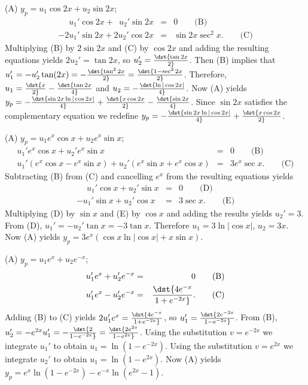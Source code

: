 \documentclass[dvips]{book}
\renewcommand{\exer}[1]{\par\medskip\;\noindent{\color{red}\bf #1.}}
\numberwithin{example}{section}
\numberwithin{equation}{section}
\numberwithin{theorem}{section}
\numberwithin{table}{section}
\numberwithin{figure}{section}
\begin{document}
\exer{5.7.2}
(A) $y_p=u_1\cos2x+u_2\sin2x$;
\setcounter{equation}{1}
\begin{eqnarray*}
\phantom{-2}u_1'\cos
2x+\phantom{2}u_2'\sin2x&=&0\qquad\text{(B)}\\ %
-2u_1'\sin2x+2u_2'\cos 2x&=&\sin2x\sec^2x.\qquad \text{(C)} %
\end{eqnarray*}
Multiplying (B) by $2\sin2x$ and (C)
by $\cos2x$ and adding the resulting equations yields $2u_2'=\tan2x$,
so $u_2'=\dst{\tan2x\over2}$. Then (B) implies that
$u_1'=-u_2'\tan(2x)=-\dst{\tan^22x\over2}=\dst{1-\sec^22x\over2}$.
Therefore,$u_1=\dst{x\over2}-\dst{\tan2x\over4}$ and
$u_2=-\dst{\ln|\cos2x|\over4}$. Now (A) yields $y_p=-\dst{\sin
2x\ln|\cos 2x|\over4} +\dst{x\cos 2x\over2}-\dst{\sin2x\over4}$. Since
$\sin2x$ satisfies the complementary equation we redefine
$y_p=-\dst{\sin 2x\ln|\cos 2x|\over4} +\dst{x\cos 2x\over2}$.


\exer{5.7.4}
(A) $y_p=u_1e^x\cos x+u_2e^x\sin x$;
\setcounter{equation}{1}
\begin{eqnarray*}
u_1'e^x\cos x+u_2'e^x\sin
x&=&0\qquad\text{(B)} \\ %
u_1'(e^x\cos x-e^x\sin x)+u_2'(e^x\sin x+e^x\cos x)&=&3e^x\sec x. \qquad\text{(C)}
\end{eqnarray*}
Subtracting (B)  from (C) and
cancelling  $e^x$ from the resulting equations yields
\begin{eqnarray*}
\phantom{-}u_1'\cos x+u_2'\sin x&=&0\qquad\text{(D)}\\ %
-u_1'\sin x+u_2'\cos x&=&3\sec x.\qquad\text{(E)} %
 \end{eqnarray*}
 Multiplying (D) by $\sin x$ and
 (E) by $\cos x$
and adding the results yields $u_2'=3$. From (D),
$u_1'=-u_2'\tan x=-3\tan x$. Therefore $u_1=3\ln|\cos x|$, $u_2=3x$.
Now (A) yields $y_p=3e^x(\cos x \ln |\cos x|+x\sin x)$.


\exer{5.7.6} (A)
$y_p=u_1e^x+u_2e^{-x}$;
\setcounter{equation}{1}
\begin{eqnarray*}
u_1'e^x+u_2'e^{-x}&=&0\qquad\text{(B)}\\ %
u_1'e^x-u_2'e^{-x}&=&\dst{4e^{-x}\over 1+e^{-2x}}.\qquad\text{(C)} %
\end{eqnarray*}
Adding (B) to (C) yields
$2u_1'e^x=\dst{4e^{-x}\over 1+e^{-2x}}$, so $u_1'=\dst{2e^{-2x}\over
1-e^{-2x}}$. From (B),
$u_2'=-e^{2x}u_1'=-\dst{2\over1-e^{-2x}}=\dst{2e^{2x}\over1-e^{2x}}$.
Using the substitution $v=e^{-2x}$ we integrate $u_1'$ to obtain
$u_1=\ln(1-e^{-2x})$. Using the substitution $v=e^{2x}$ we integrate
$u_2'$ to obtain $u_1=\ln(1-e^{2x})$. Now (A) yields
$y_p=e^x\ln(1-e^{-2x})-e^{-x}\ln(e^{2x}-1)$.
\end{document}
